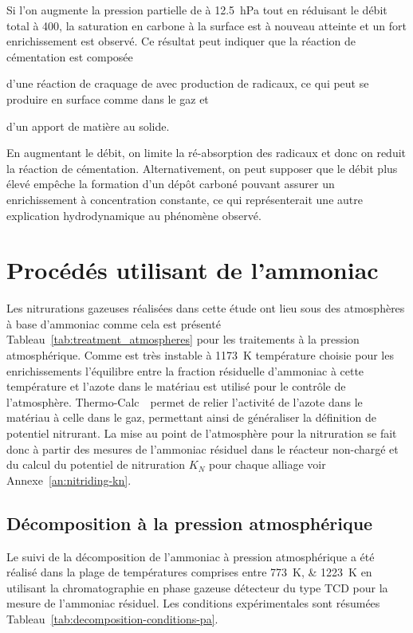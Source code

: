 Si l'on augmente la pression partielle de  à \SI{12,5}{\hecto\pascal} tout en réduisant le débit total à \SI{400}{\sccm}, la saturation en carbone à la surface est à nouveau atteinte et un fort enrichissement est observé. Ce résultat peut indiquer que la réaction de cémentation est composée \begin{inparaenum}[(i)] \item d'une réaction de craquage de  avec production de radicaux, ce qui peut se produire en surface comme dans le gaz et \item d'un apport de matière au solide. \end{inparaenum} En augmentant le débit, on limite la ré-absorption des radicaux et donc on reduit la réaction de cémentation. Alternativement, on peut supposer que le débit plus élevé empêche la formation d'un dépôt carboné pouvant assurer un enrichissement à concentration constante, ce qui représenterait une autre explication hydrodynamique au phénomène observé.

\section{Procédés utilisant de l'ammoniac}
\label{sec:pyrolyse_ammonia}

Les nitrurations gazeuses réalisées dans cette étude ont lieu sous des atmosphères à base d'ammoniac comme cela est présenté Tableau~\ref{tab:treatment_atmospheres} pour les traitements à la pression atmosphérique. Comme  est très instable à \SI{1173}{\kelvin} \textendash{} température choisie pour les enrichissements \textendash{} l'équilibre entre la fraction résiduelle d'ammoniac à cette température et l'azote dans le matériau est utilisé pour le contrôle de l'atmosphère.  Thermo-Calc~\cite{Andersson2002,Borgenstam2000} permet de relier l'activité de l'azote dans le matériau à celle dans le gaz, permettant ainsi de généraliser la définition de potentiel nitrurant. La mise au point de l'atmosphère pour la nitruration se fait donc à partir des mesures de l'ammoniac résiduel dans le réacteur non-chargé et du calcul du potentiel de nitruration $K_{N}$ pour chaque alliage \textemdash{} voir Annexe~\ref{an:nitriding-kn}.

\subsection{Décomposition à la pression atmosphérique}

Le suivi de la décomposition de l'ammoniac à pression atmosphérique a été réalisé dans la plage de températures comprises entre \SIlist{773;1223}{\kelvin} en utilisant la chromatographie en phase gazeuse \textendash{} détecteur du type TCD \textendash{} pour la mesure de l'ammoniac résiduel. Les conditions expérimentales sont résumées Tableau~\ref{tab:decomposition-conditions-pa}.

